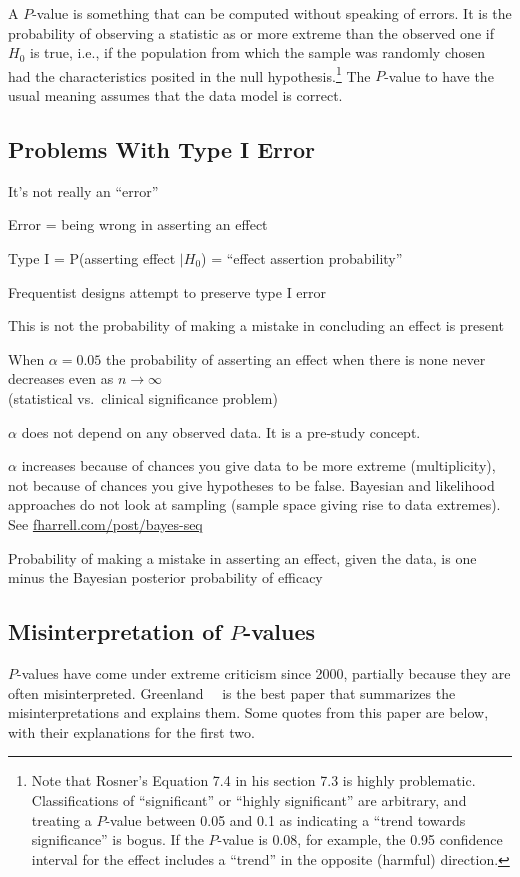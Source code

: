 A $P$-value is something that can be computed without speaking of
errors.  It is the probability of observing a statistic as or more
extreme than the observed one if $H_0$ is true, i.e., if the
population from which the sample was randomly chosen had the
characteristics posited in the null hypothesis.\footnote{Note that
  Rosner's Equation 7.4 in his section 7.3 is highly 
problematic.  Classifications of ``significant'' or ``highly
significant'' are arbitrary, and treating a $P$-value between 0.05 and
0.1 as indicating a ``trend towards significance'' is bogus.  If the
$P$-value is 0.08, for example, the 0.95 confidence interval for the
effect includes a ``trend'' in the opposite (harmful) direction.}  The
$P$-value to have the usual meaning assumes that the data model is correct.

\subsection{Problems With Type I Error}
\bi
\item It's not really an ``error''
  \bi
  \item Error = being wrong in asserting an effect
  \item Type I = P(asserting effect $| H_{0}$) = ``effect assertion probability''
  \ei
\item Frequentist designs attempt to preserve type I error
\item This is not the probability of making a mistake in concluding an
  effect is present
\item When $\alpha=0.05$ the probability of asserting an effect when
  there is none never decreases even as $n \rightarrow \infty$
  \\ (statistical vs.\ clinical significance problem)
\item $\alpha$ does not depend on any observed data.  It is a
  pre-study concept.
\item $\alpha$ increases because of chances you give data to be more
  extreme (multiplicity), not because of chances you give hypotheses
  to be false.  Bayesian and likelihood approaches do not look at
  sampling (sample space giving rise to data extremes).  See
  \href{http://fharrell.com/post/bayes-seq}{\url{fharrell.com/post/bayes-seq}} 
\item Probability of making a mistake in asserting an effect, given
  the data, is one minus the Bayesian posterior probability of efficacy
\ei

\subsection{Misinterpretation of $P$-values}
$P$-values have come under extreme criticism since 2000, partially
because they are often misinterpreted. Greenland~\etal~\cite{gre16sta}
is the best paper that summarizes the misinterpretations and explains
them.  Some quotes from this paper are below, with their explanations
for the first two.

